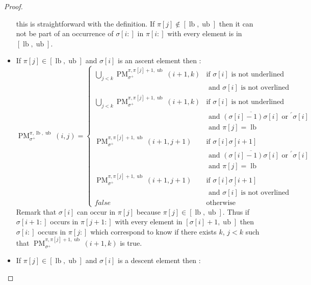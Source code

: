 \documentclass[a4paper]{llncs}
\newcommand{\ptext}{\pi}
\newcommand{\pmotif}{\sigma}
\newcommand{\pbmotif}{\pmotif^+}
\DeclareMathOperator{\PMa}{PM}
\newcommand{\PM}[6]{\PMa_{{#1}}^{{#2},{#3},{#4}}({#5},{#6})}
\DeclareMathOperator{\lb}{lb}
\DeclareMathOperator{\ub}{ub}
\begin{document}
\begin{proof}
\begin{itemize}
	this is straightforward with the definition. If $\ptext[j] \notin [\lb,\ub]$ then it can not be part of an occurrence of  $\pmotif[i:]$ in $\ptext[i:]$ with every element is in $[\lb,\ub]$.
	
	\item If $\ptext[j] \in [\lb,\ub]$ and $\pmotif[i]$ is an ascent element then :
	$$
	\PM{\pbmotif}{\ptext}{\lb}{\ub}{i}{j}=
	\begin{cases}
		\bigcup_{j<k} \PM{\pbmotif}{\ptext}{\ptext[j]+1}{\ub}{i+1}{k}
			& \text{if $\pmotif[i]$ is not underlined } \\
			& \text{ and $\pmotif[i]$ is not overlined} \\
		\bigcup_{j<k} \PM{\pbmotif}{\ptext}{\ptext[j]+1}{\ub}{i+1}{k}
			& \text{if $\pmotif[i]$ is not underlined } \\
			& \text{ and $\overline{(\pmotif[i]-1)\pmotif[i]}$ or $^\ulcorner{\pmotif[i]}$}\\
			& \text{ and $\ptext[j]=\lb$} \\
		\PM{\pbmotif}{\ptext}{\ptext[j]+1}{\ub}{i+1}{j+1}
			& \text{if $\underline{\pmotif[i]\pmotif[i+1]}$ } \\
			& \text{ and $\overline{(\pmotif[i]-1)\pmotif[i]}$ or $^\ulcorner{\pmotif[i]}$}\\
			& \text{ and $\ptext[j]=\lb$} \\
		\PM{\pbmotif}{\ptext}{\ptext[j]+1}{\ub}{i+1}{j+1}
			& \text{if $\underline{\pmotif[i]\pmotif[i+1]}$ } \\
			& \text{ and $\pmotif[i]$ is not overlined} \\
		false & \text{otherwise}

	\end{cases}
	$$	
	Remark that $\pmotif[i]$ can occur in $\ptext[j]$ because $\ptext[j] \in [\lb,\ub]$.
	Thus if $\pmotif[i+1:]$ occurs in $\ptext[j+1:]$ with every element in $[\pmotif[i]+1,\ub]$ then 
 	$\pmotif[i:]$ occurs in $\ptext[j:]$  	
 	which correspond to know if there exists $k$, $j<k$ such that
	$\PM{\pbmotif}{\ptext}{\ptext[j]+1}{\ub}{i+1}{k}$ is true.

	
	\item If $\ptext[j] \in [\lb,\ub]$ and $\pmotif[i]$ is a descent element then :


\end{itemize}
\end{proof}
\end{document}
